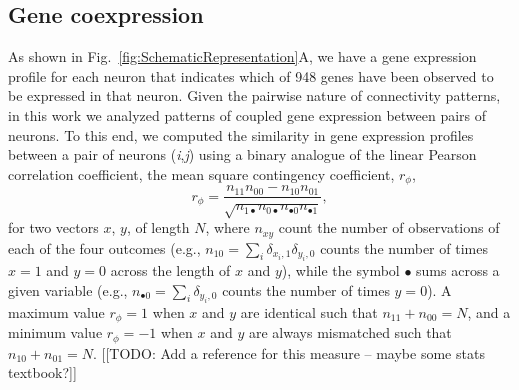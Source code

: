 \documentclass[10pt,letterpaper]{article}
\begin{document}
\subsection*{Gene coexpression}
As shown in Fig.~\ref{fig:SchematicRepresentation}A, we have a gene expression profile for each neuron that indicates which of 948 genes have been observed to be expressed in that neuron.
Given the pairwise nature of connectivity patterns, in this work we analyzed patterns of coupled gene expression between pairs of neurons.
To this end, we computed the similarity in gene expression profiles between a pair of neurons (\textit{i},\textit{j}) using a binary analogue of the linear Pearson correlation coefficient, the mean square contingency coefficient, $r_\phi$,
\begin{equation}
    r_\phi = \frac{n_{11}n_{00} - n_{10}n_{01}}{\sqrt{n_{1\bullet}n_{0\bullet}n_{\bullet 0}n_{\bullet 1}}},
\end{equation}
for two vectors $x$, $y$, of length $N$, where $n_{xy}$ count the number of observations of each of the four outcomes (e.g., $n_{10} = \sum_i \delta_{x_i,1}\delta_{y_i,0}$ counts the number of times $x=1$ and $y=0$ across the length of $x$ and $y$), while the symbol $\bullet$ sums across a given variable (e.g., $n_{\bullet 0} = \sum_i \delta_{y_i,0}$ counts the number of times $y = 0$).
A maximum value $r_\phi = 1$ when $x$ and $y$ are identical such that $n_{11} + n_{00} = N$, and a minimum value $r_\phi = -1$ when $x$ and $y$ are always mismatched such that $n_{10} + n_{01} = N$.
[[TODO: Add a reference for this measure -- maybe some stats textbook?]]
\end{document}
